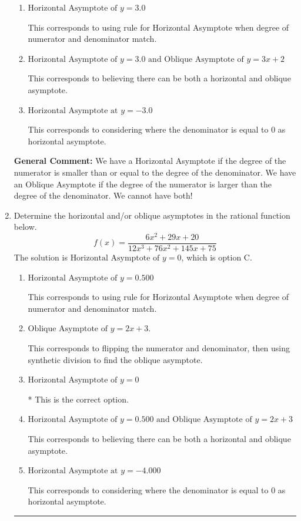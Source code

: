 \documentclass{extbook}[14pt]
\newcommand{\litem}[1]{\item #1

\rule{\textwidth}{0.4pt}}
\begin{document}
\begin{enumerate}
{\begin{enumerate}[label=\Alph*.]
This is the correct answer.
\item \( \text{Horizontal Asymptote of } y = 3.0  \)

This corresponds to using rule for Horizontal Asymptote when degree of numerator and denominator match.
\item \( \text{Horizontal Asymptote of } y = 3.0 \text{ and Oblique Asymptote of } y = 3x + 2 \)

This corresponds to believing there can be both a horizontal and oblique asymptote.
\item \( \text{Horizontal Asymptote at } y = -3.0 \)

This corresponds to considering where the denominator is equal to 0 as horizontal asymptote.
\end{enumerate}

\textbf{General Comment:} We have a Horizontal Asymptote if the degree of the numerator is smaller than or equal to the degree of the denominator. We have an Oblique Asymptote if the degree of the numerator is larger than the degree of the denominator. We cannot have both!
}
\litem{
Determine the horizontal and/or oblique asymptotes in the rational function below.
\[ f(x) = \frac{6x^{2} +29 x + 20}{12x^{3} +76 x^{2} +145 x + 75} \]The solution is \( \text{Horizontal Asymptote of } y = 0 \), which is option C.\begin{enumerate}[label=\Alph*.]
\item \( \text{Horizontal Asymptote of } y = 0.500  \)

This corresponds to using rule for Horizontal Asymptote when degree of numerator and denominator match.
\item \( \text{Oblique Asymptote of } y = 2x + 3. \)

This corresponds to flipping the numerator and denominator, then using synthetic division to find the oblique asymptote.
\item \( \text{Horizontal Asymptote of } y = 0 \)

* This is the correct option.
\item \( \text{Horizontal Asymptote of } y = 0.500 \text{ and Oblique Asymptote of } y = 2x + 3 \)

This corresponds to believing there can be both a horizontal and oblique asymptote.
\item \( \text{Horizontal Asymptote at } y = -4.000 \)

This corresponds to considering where the denominator is equal to 0 as horizontal asymptote.
\end{enumerate}

}
\end{enumerate}
\end{document}
